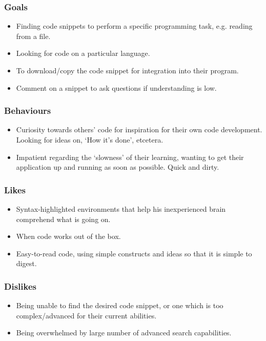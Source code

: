\documentclass[11pt,a4paper]{article}
\begin{document}
\subsubsection{Goals}

\begin{itemize}
\item Finding code snippets to perform a specific programming task,
e.g. reading from a file.
\item Looking for code on a particular language.
\item To download/copy the code snippet for integration into their
program.
\item Comment on a snippet to ask questions if understanding is low.
\end{itemize}

\subsubsection{Behaviours}

\begin{itemize}
\item Curiosity towards others' code for inspiration for their own code
development. Looking for ideas on, `How it's done', etcetera.
\item Impatient regarding the `slowness' of their learning, wanting to
get their application up and running as soon as possible. Quick and
dirty.
\end{itemize}

\subsubsection{Likes}

\begin{itemize}
\item Syntax-highlighted environments that help his inexperienced brain
comprehend what is going on.
\item When code works out of the box.
\item Easy-to-read code, using simple constructs and ideas so that it
is simple to digest.
\end{itemize}

\subsubsection{Dislikes}

\begin{itemize}
\item Being unable to find the desired code snippet, or one which is
too complex/advanced for their current abilities.
\item Being overwhelmed by large number of advanced search capabilities.
\end{itemize}
\end{document}
